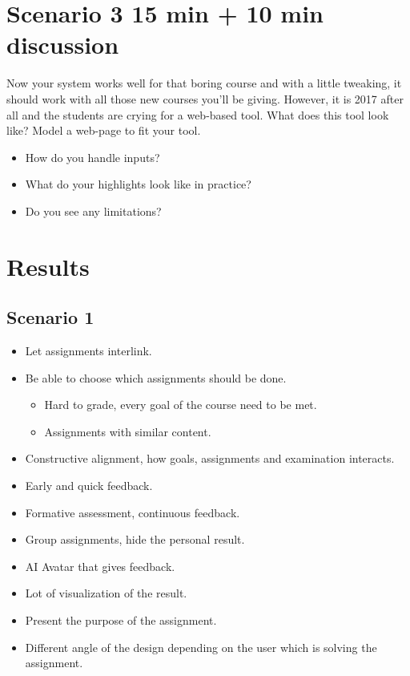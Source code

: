 \section*{Scenario 3 15 min + 10 min discussion}
Now your system works well for that boring course and with a little tweaking, it should work with all those new courses you'll be giving. However, it is 2017 after all and the students are crying for a web-based tool. What does this tool look like? Model a web-page to fit your tool.

\begin{itemize}
\item How do you handle inputs?
\item What do your highlights look like in practice?
\item Do you see any limitations?
\end{itemize} 


\section*{Results}
\subsection*{Scenario 1}
\begin{itemize}
\item Let assignments interlink.
\item Be able to choose which assignments should be done.
    \begin{itemize}
    \item Hard to grade, every goal of the course need to be met.
    \item Assignments with similar content.
    \end{itemize}
\item Constructive alignment, how goals, assignments and examination interacts.
\item Early and quick feedback.
\item Formative assessment, continuous feedback.
\item Group assignments, hide the personal result.
\item AI Avatar that gives feedback.
\item Lot of visualization of the result.
\item Present the purpose of the assignment.
\item Different angle of the design depending on the user which is solving the assignment.
\end{itemize}

